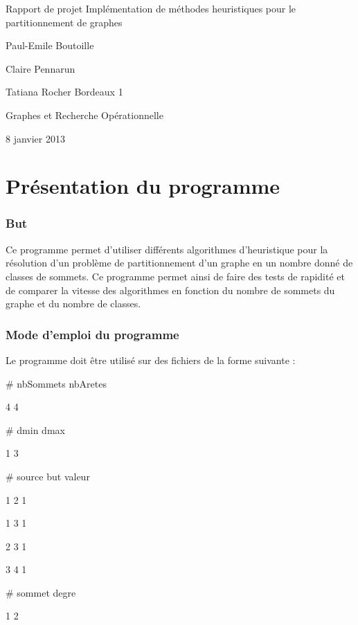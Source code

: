 \documentclass[12pt]{article}
\begin{document}
\begin{titlepage}
\begin{center}

\hfill
\vfill
\bigskip
\huge{Rapport de projet} 
\vfill
\bigskip 
\Huge 
\bigskip Implémentation de méthodes heuristiques pour le partitionnement de graphes \par 
\vfill
\Large Paul-Emile Boutoille \par
		Claire Pennarun \par 
		Tatiana Rocher
\vfill
\Large Bordeaux 1 \par \Large Graphes et Recherche Opérationnelle		
		\bigskip 
\bigskip

\Large
8 janvier 2013
\end{center}
\end{titlepage}

\tableofcontents
\newpage

\part{Présentation du programme}
\section{But}

Ce programme permet d’utiliser différents algorithmes d’heuristique pour la résolution d’un problème de partitionnement d’un graphe en un nombre donné de classes de sommets. Ce programme permet ainsi de faire des tests de rapidité et de comparer la vitesse des algorithmes en fonction du nombre de sommets du graphe et du nombre de classes.

\section{Mode d'emploi du programme}

Le programme doit être utilisé sur des fichiers de la forme suivante :

\# nbSommets nbAretes

4 4

\# dmin dmax

1 3

\# source but valeur

1 2 1

1 3 1

2 3 1

3 4 1

\# sommet degre

1 2
\end{document}
